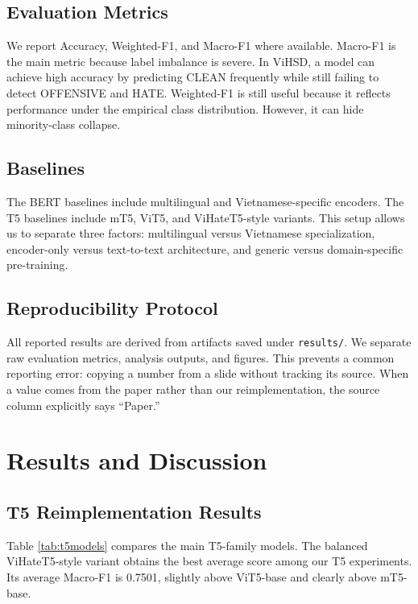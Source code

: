 \documentclass[journal]{IEEEtran}
\newcommand{\mf}{Macro-F1}
\newcommand{\wf}{Weighted-F1}
\newcommand{\acc}{Accuracy}
\begin{document}
\subsection{Evaluation Metrics}
We report \acc{}, \wf{}, and \mf{} where available. \mf{} is the main metric because label imbalance is severe. In ViHSD, a model can achieve high accuracy by predicting CLEAN frequently while still failing to detect OFFENSIVE and HATE. Weighted-F1 is still useful because it reflects performance under the empirical class distribution. However, it can hide minority-class collapse.

\subsection{Baselines}
The BERT baselines include multilingual and Vietnamese-specific encoders. The T5 baselines include mT5, ViT5, and ViHateT5-style variants. This setup allows us to separate three factors: multilingual versus Vietnamese specialization, encoder-only versus text-to-text architecture, and generic versus domain-specific pre-training.

\subsection{Reproducibility Protocol}
All reported results are derived from artifacts saved under \texttt{results/}. We separate raw evaluation metrics, analysis outputs, and figures. This prevents a common reporting error: copying a number from a slide without tracking its source. When a value comes from the paper rather than our reimplementation, the source column explicitly says ``Paper.''

\section{Results and Discussion}
\subsection{T5 Reimplementation Results}
Table \ref{tab:t5models} compares the main T5-family models. The balanced ViHateT5-style variant obtains the best average score among our T5 experiments. Its average \mf{} is 0.7501, slightly above ViT5-base and clearly above mT5-base.
\end{document}
